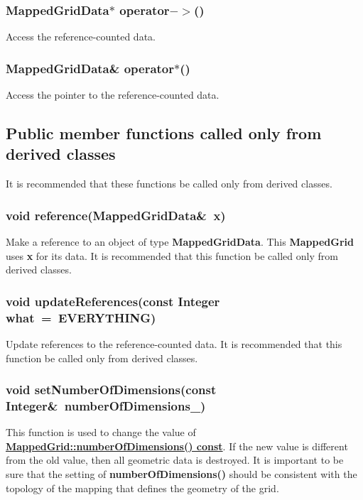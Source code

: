 \documentclass{article}
\begin{document}
  \subsubsection{MappedGridData$*$ operator${-}{>}$()}
  \label{MappedGrid::operator->()}
    Access the reference-counted data.

  \subsubsection{MappedGridData\& operator$*$()}
  \label{MappedGrid::operator*()}
    Access the pointer to the reference-counted data.
\subsection{Public member functions called only from derived classes}
\label{MappedGrid::PublicDerivedClassMemberFunctions}

It is recommended that these functions be called only from derived classes.

  \subsubsection{void reference(MappedGridData\&~x)}
  \label{MappedGrid::reference(MappedGridData_x)}
    Make a reference to an object of type \textbf{MappedGridData}.
    This \textbf{MappedGrid} uses \textbf{x} for its data.
    It is recommended that this function be called only from derived classes.
  \subsubsection{void updateReferences(const Integer what~=~EVERYTHING)}
  \label{MappedGrid::updateReferences(what)}
    Update references to the reference-counted data.
    It is recommended that this function be called only from derived classes.
  \subsubsection{void setNumberOfDimensions(const Integer\&~numberOfDimensions\_)}
  \label{MappedGrid::setNumberOfDimensions(numberOfDimensions_)}
    This function is used to change the value of
    {\bf{}\hyperref{numberOfDimensions()}{numberOfDimensions() \rm(\S}{)}{MappedGrid::numberOfDimensions() const}}.
    If the new value is different from the old value, then all geometric data is destroyed.
    It is important to be sure that the setting of \textbf{numberOfDimensions()} should be
    consistent with the topology of the mapping that defines the geometry of the grid.
\end{document}
